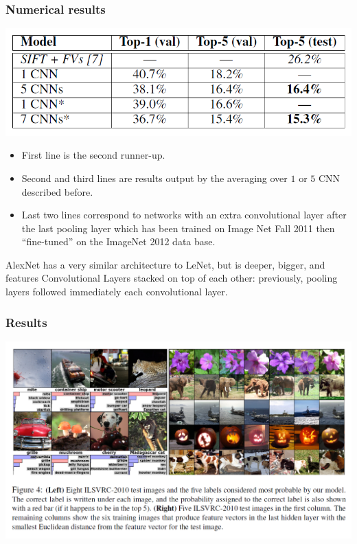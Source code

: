 \begin{frame}
	\frametitle{Numerical results}
	
	\begin{center}
		\includegraphics[scale=0.6]{figs/Alexnet_error}
	\end{center}



\bigskip

\begin{itemize}
	\item First line is the second runner-up.
	
	\item Second and third lines are results output by the averaging over $1$ or $5$ CNN described before. 
	
	\item Last two lines correspond to networks with an extra convolutional layer after the last pooling layer which has been trained on Image Net Fall 2011 then ``fine-tuned'' on the ImageNet 2012 data base. 
\end{itemize}


\bigskip

AlexNet has a very similar architecture to LeNet, but is deeper, bigger, and features Convolutional Layers stacked on top of each other: previously, pooling layers followed immediately each convolutional layer. 

\end{frame}



\begin{frame}
	\frametitle{Results}
	
	\begin{center}
		\includegraphics[scale=0.7]{figs/AlexNet_results_images}
	\end{center}
\end{frame}









